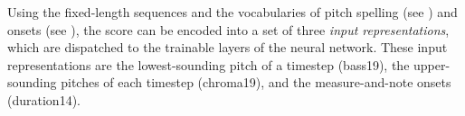
Using the fixed-length sequences and the vocabularies of
pitch spelling (see
) and onsets
(see
),
the score can be encoded into a set of three \emph{input
representations}, which are dispatched to the trainable
layers of the neural network. These input representations
are the lowest-sounding pitch of a timestep (\gls{bass19}),
the upper-sounding pitches of each timestep
(\gls{chroma19}), and the measure-and-note onsets
(\gls{duration14}).
